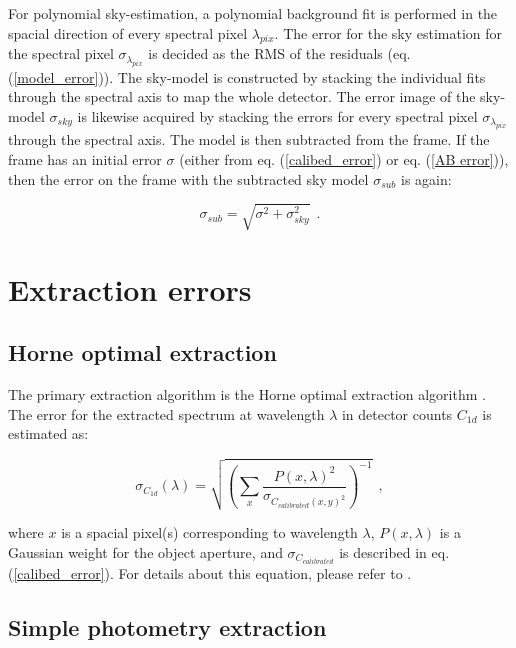 \documentclass{article}
\begin{document}
\noindent For polynomial sky-estimation, a polynomial background fit is performed in the spacial direction of every spectral pixel $\lambda_{pix}$. The error for the sky estimation for the spectral pixel $\sigma_{\lambda_{pix}}$ is decided as the RMS of the residuals (eq. (\ref{model_error})). The sky-model is constructed by stacking the individual fits through the spectral axis to map the whole detector. The error image of the sky-model $\sigma_{sky}$ is likewise acquired by stacking the errors for every spectral pixel $\sigma_{\lambda_{pix}}$ through the spectral axis. The model is then subtracted from the frame. If the frame has an initial error $\sigma$ (either from eq. (\ref{calibed_error}) or eq. (\ref{AB error})), then the error on the frame with the subtracted sky model $\sigma_{sub}$ is again:

\begin{equation}\label{skysub}
    \sigma_{sub} = \sqrt{\sigma^2 + \sigma_{sky}^2} \ \ .
\end{equation}



\section{Extraction errors}

\subsection{Horne optimal extraction}

The primary extraction algorithm is the Horne optimal extraction algorithm \cite{Horne_1986}. The error for the extracted spectrum at wavelength $\lambda$ in detector counts $C_{1d}$ is estimated as: 

\begin{equation}\label{horne_error}
    \sigma_{C_{1d}}(\lambda) = \sqrt{\left(\sum_{x} \frac{P(x, \lambda)^2}{\sigma_{C_{calibrated}(x,y)^2}}\right)^{-1}} \ \ ,
\end{equation}

\noindent where $x$ is a spacial pixel(s) corresponding to wavelength $\lambda$, $P(x,\lambda)$ is a Gaussian weight for the object aperture, and $\sigma_{C_{calibrated}}$ is described in eq. (\ref{calibed_error}). For details about this equation, please refer to \cite{Horne_1986}.

\subsection{Simple photometry extraction}\label{simple_eror}
\end{document}
